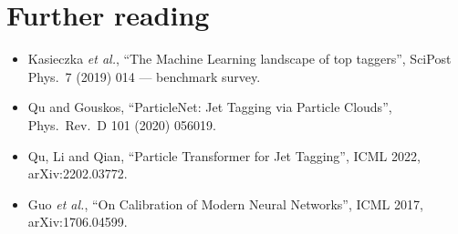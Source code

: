 \documentclass[11pt,a4paper]{article}
\begin{document}
\section*{Further reading}
\begin{itemize}
    \item Kasieczka \emph{et al.}, ``The Machine Learning landscape
          of top taggers'', SciPost Phys.\ 7 (2019) 014 ---
          benchmark survey.
    \item Qu and Gouskos, ``ParticleNet: Jet Tagging via Particle
          Clouds'', Phys.\ Rev.\ D 101 (2020) 056019.
    \item Qu, Li and Qian, ``Particle Transformer for Jet
          Tagging'', ICML 2022, arXiv:2202.03772.
    \item Guo \emph{et al.}, ``On Calibration of Modern Neural
          Networks'', ICML 2017, arXiv:1706.04599.
\end{itemize}
\end{document}
